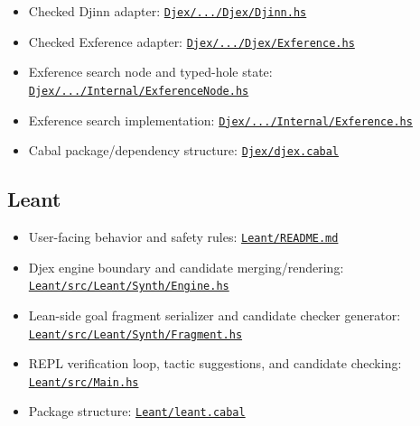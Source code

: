 \documentclass[11pt,oneside]{article}
\newcommand{\sourcelink}[2]{\href{#1}{\nolinkurl{#2}}}
\begin{document}
\begin{itemize}
  \item Checked Djinn adapter:
  \sourcelink{https://github.com/VladimirReshetnikov/Djex/blob/f50b5eac86726c7530d95e48c27101b7c0fa25c9/djinn/src-core/Language/Haskell/Djex/Djinn.hs}{Djex/.../Djex/Djinn.hs}
  \item Checked Exference adapter:
  \sourcelink{https://github.com/VladimirReshetnikov/Djex/blob/f50b5eac86726c7530d95e48c27101b7c0fa25c9/exference/src-core/Language/Haskell/Djex/Exference.hs}{Djex/.../Djex/Exference.hs}
  \item Exference search node and typed-hole state:
  \sourcelink{https://github.com/VladimirReshetnikov/Djex/blob/f50b5eac86726c7530d95e48c27101b7c0fa25c9/exference/src-core/Language/Haskell/Exference/Core/Internal/ExferenceNode.hs}{Djex/.../Internal/ExferenceNode.hs}
  \item Exference search implementation:
  \sourcelink{https://github.com/VladimirReshetnikov/Djex/blob/f50b5eac86726c7530d95e48c27101b7c0fa25c9/exference/src-core/Language/Haskell/Exference/Core/Internal/Exference.hs}{Djex/.../Internal/Exference.hs}
  \item Cabal package/dependency structure:
  \sourcelink{https://github.com/VladimirReshetnikov/Djex/blob/f50b5eac86726c7530d95e48c27101b7c0fa25c9/djex.cabal}{Djex/djex.cabal}
\end{itemize}

\subsection*{Leant}

\begin{itemize}
  \item User-facing behavior and safety rules:
  \sourcelink{https://github.com/VladimirReshetnikov/Leant/blob/0160237e4bdf6e342a55f5a86ce5d5292728024f/README.md}{Leant/README.md}
  \item Djex engine boundary and candidate merging/rendering:
  \sourcelink{https://github.com/VladimirReshetnikov/Leant/blob/0160237e4bdf6e342a55f5a86ce5d5292728024f/src/Leant/Synth/Engine.hs}{Leant/src/Leant/Synth/Engine.hs}
  \item Lean-side goal fragment serializer and candidate checker generator:
  \sourcelink{https://github.com/VladimirReshetnikov/Leant/blob/0160237e4bdf6e342a55f5a86ce5d5292728024f/src/Leant/Synth/Fragment.hs}{Leant/src/Leant/Synth/Fragment.hs}
  \item REPL verification loop, tactic suggestions, and candidate checking:
  \sourcelink{https://github.com/VladimirReshetnikov/Leant/blob/0160237e4bdf6e342a55f5a86ce5d5292728024f/src/Main.hs}{Leant/src/Main.hs}
  \item Package structure:
  \sourcelink{https://github.com/VladimirReshetnikov/Leant/blob/0160237e4bdf6e342a55f5a86ce5d5292728024f/leant.cabal}{Leant/leant.cabal}
\end{itemize}
\end{document}

